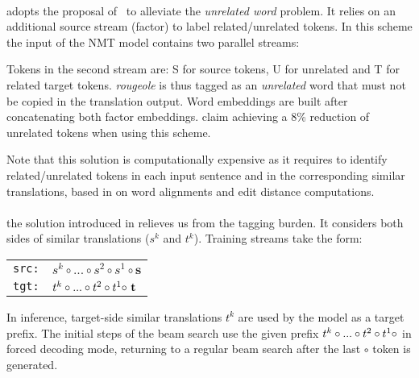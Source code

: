\paragraph{} adopts the proposal of~\citet{xu20boosting} to alleviate the {\em unrelated word} problem. It relies on an additional source stream (factor) to label related/unrelated tokens. In this scheme the input of the NMT model contains two parallel streams:

\begin{center}
\end{center}

Tokens in the second stream are: S for source tokens, U for unrelated and T for related target tokens. {\it rougeole} is thus tagged as an {\it unrelated} word that must not be copied in the translation output.
Word embeddings are built after concatenating both factor embeddings.
%
\citet{xu20boosting} claim achieving a 8\% reduction of unrelated tokens when using this scheme.

Note that this solution is computationally expensive as it requires to identify related/unrelated tokens in each input sentence and in the corresponding similar translations, based in \citet{xu20boosting} on word alignments and edit distance computations.

\paragraph{} the solution introduced in \citet{Pham20Priming} relieves us from the tagging burden. It considers both sides of similar translations ($s^k$ and $t^k$). Training streams take the form:

\begin{center}
\begin{tabular}{rl}
\texttt{src:} & $s^{k} \circ ... \circ s^{2} \circ s^{1} \circ \textbf{s}$ \\
\texttt{tgt:} & $\textcolor{black}{t^{k} \circ ... \circ t^{2} \circ t^{1} \circ}\ \textbf{t}$ \\
\end{tabular}
\end{center}
\noindent In inference, target-side similar translations \textcolor{black}{$t^k$} are used by the model as a target prefix. The initial steps of the beam search use the given prefix $\textcolor{black}{t^{k} \circ ... \circ t^{2} \circ t^{1} \circ}$ in forced decoding mode, returning to a regular beam search after the last \textcolor{black}{$\circ$} token is generated.


